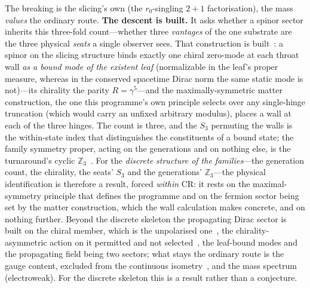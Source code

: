 \documentclass[11pt,a4paper]{article}
\theoremstyle{definition}
\begin{document}
The breaking is the slicing's own (the $r_0$-singling $2+1$ factorisation), the
mass \emph{values} the ordinary route. \textbf{The descent is built.} It asks whether a spinor sector
inherits this three-fold count---whether three \emph{vantages} of the
one substrate are the three physical \emph{seats} a single observer sees.
That construction is built~\cite{JanzenMatter}: a spinor on the slicing structure binds exactly one chiral zero-mode at each throat wall \emph{as a bound mode of the existent leaf} (normalizable in the leaf's proper measure, whereas in the conserved spacetime Dirac norm the same static mode is not)---its chirality the parity $R=\gamma^5$---and the maximally-symmetric matter construction, the one this programme's own principle selects over any single-hinge truncation (which would carry an unfixed arbitrary modulus), places a wall at each of the three hinges. The count is three, and the $S_3$ permuting the walls is the within-state index that distinguishes the
constituents of a bound state; the family symmetry proper, acting on the generations and on nothing else, is
the turnaround's cyclic $\mathbb{Z}_3$~\cite{JanzenMatter}. For the \emph{discrete structure of the families}---the generation count, the chirality, the seats' $S_3$ and the generations' $\mathbb{Z}_3$---the physical identification is therefore a result, forced \emph{within} CR: it rests on the maximal-symmetry principle that defines the programme and on the fermion sector being set by the matter construction, which the wall calculation makes concrete, and on nothing further. Beyond the discrete skeleton the propagating Dirac sector is built on the chiral
member, which is the unpolarised one~\cite{JanzenDynamics}, the chirality-asymmetric action on it permitted
and not selected~\cite{JanzenMatter}, the leaf-bound modes and the propagating field
being two sectors; what stays the ordinary route is the gauge content, excluded from the
continuous isometry~\cite{JanzenBoundary}, and the mass spectrum (electroweak). For the discrete skeleton this is a result rather than a conjecture.
\end{document}
